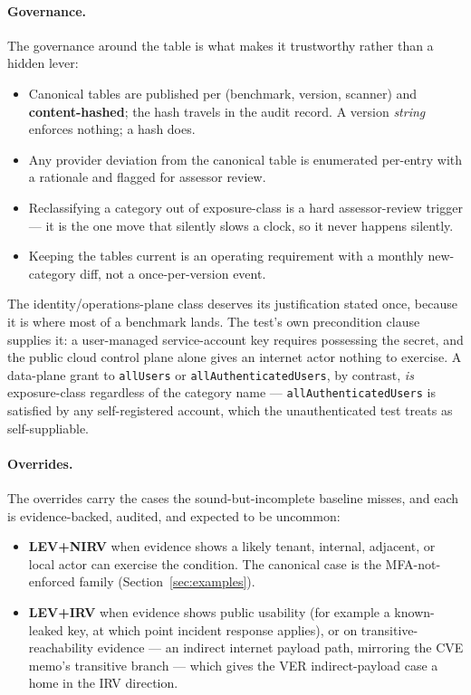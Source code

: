 \documentclass[11pt]{article}
\newcommand{\code}[1]{\texttt{#1}}
\begin{document}
\paragraph{Governance.} The governance around the table is what makes it trustworthy
rather than a hidden lever:

\begin{itemize}[leftmargin=1.4em,nosep,topsep=3pt]
\item Canonical tables are published per (benchmark, version, scanner) and
  \textbf{content-hashed}; the hash travels in the audit record. A version
  \emph{string} enforces nothing; a hash does.
\item Any provider deviation from the canonical table is enumerated per-entry with a
  rationale and flagged for assessor review.
\item Reclassifying a category out of exposure-class is a hard assessor-review
  trigger --- it is the one move that silently slows a clock, so it never happens
  silently.
\item Keeping the tables current is an operating requirement with a monthly
  new-category diff, not a once-per-version event.
\end{itemize}

The identity/operations-plane class deserves its justification stated once, because
it is where most of a benchmark lands. The test's own precondition clause supplies
it: a user-managed service-account key requires possessing the secret, and the public
cloud control plane alone gives an internet actor nothing to exercise. A data-plane
grant to \code{allUsers} or \code{allAuthenticatedUsers}, by contrast, \emph{is}
exposure-class regardless of the category name --- \code{allAuthenticatedUsers} is
satisfied by any self-registered account, which the unauthenticated test treats as
self-suppliable.

\paragraph{Overrides.} The overrides carry the cases the sound-but-incomplete
baseline misses, and each is evidence-backed, audited, and expected to be uncommon:

\begin{itemize}[leftmargin=1.4em,nosep,topsep=3pt]
\item \textbf{LEV+NIRV} when evidence shows a likely tenant, internal, adjacent, or
  local actor can exercise the condition. The canonical case is the MFA-not-enforced
  family (Section~\ref{sec:examples}).
\item \textbf{LEV+IRV} when evidence shows public usability (for example a
  known-leaked key, at which point incident response applies), or on
  transitive-reachability evidence --- an indirect internet payload path, mirroring
  the CVE memo's transitive branch --- which gives the VER indirect-payload case
  a home in the IRV direction.
\end{itemize}
\end{document}
